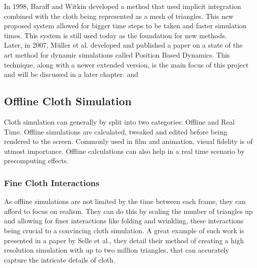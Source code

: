 \documentclass[12pt,a4paper]{article}
\begin{document}
In 1998, Baraff and Witkin developed a method that used implicit integration combined with the cloth being represented as a mesh of triangles. This new proposed system allowed for bigger time steps to be taken and faster simulation times. This system is still used today as the foundation for new methods. \cite{Baraff1998largesteps} \\

Later, in 2007, Müller et al. developed and published a paper on a state of the art method for dynamic simulations called Position Based Dynamics. This technique, along with a newer extended version, is the main focus of this project and will be discussed in a later chapter. \cite{muller2007position} and \cite{macklin2016xpbd}

\subsection{Offline Cloth Simulation}
Cloth simulation can generally by split into two categories: Offline and Real Time. Offline simulations are calculated, tweaked and edited before being rendered to the screen. Commonly used in film and animation, visual fidelity is of utmost importance. Offline calculations can also help in a real time scenario by precomputing effects. \\

\subsubsection{Fine Cloth Interactions}
As offline simulations are not limited by the time between each frame, they can afford to focus on realism. They can do this by scaling the number of triangles up and allowing for finer interactions like folding and wrinkling, these interactions being crucial to a convincing cloth simulation. A great example of such work is presented in a paper by Selle et al., they detail their method of creating a high resolution simulation with up to two million triangles, that can accurately capture the intricate details of cloth. \cite{4522545}\\
\end{document}
